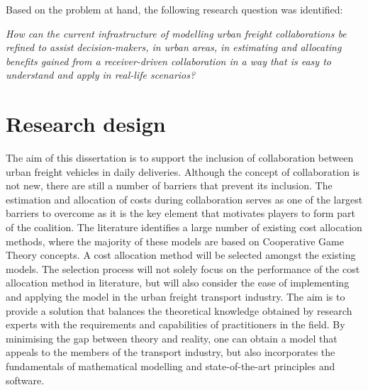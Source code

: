 Based on the problem at hand, the following research question was identified:

\textit{How can the current infrastructure of modelling urban freight collaborations be refined to assist decision-makers, in urban areas, in estimating and allocating benefits gained from a receiver-driven collaboration in a way that is easy to understand and apply in real-life scenarios?}



\section{Research design}

The aim of this dissertation is to support the inclusion of collaboration between urban freight vehicles in daily deliveries.  Although the concept of collaboration is not new, there are still a number of barriers that prevent its inclusion. The estimation and allocation of costs during collaboration serves as one of the largest barriers to overcome as it is the key element that motivates players to form part of the coalition.  The literature identifies a large number of existing cost allocation methods, where the majority of these models are based on Cooperative Game Theory concepts. A cost allocation method will be selected amongst the existing models. The selection process will not solely focus on the performance of the cost allocation method in literature, but will also consider the ease of implementing and applying the model in the urban freight transport industry. The aim is to provide a solution that balances the theoretical knowledge obtained by research experts with the requirements and capabilities of practitioners in the field. By minimising the gap between theory and reality, one can obtain a model that appeals to the members of the transport industry, but also incorporates the fundamentals of mathematical modelling and state-of-the-art principles and software.


